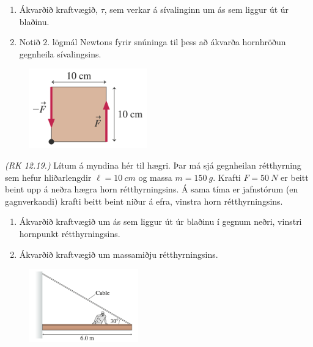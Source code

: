 \ifdefined \wholebook \else\documentclass[oneside]{book}\usepackage{EdlBook}\graphicspath{{figures/}}
\begin{document}
\begin{enumerate}[label = \textbf{Dæmi \thechapter.\arabic*.}]
\begin{minipage}{\linewidth}
\begin{enumerate}[label = \textbf{(\alph*)}]
    \item Ákvarðið kraftvægið, $\tau$, sem verkar á sívalinginn um ás sem liggur út úr blaðinu.
    \item Notið $2.$ lögmál Newtons fyrir snúninga til þess að ákvarða hornhröðun gegnheila sívalingsins.
\end{enumerate}

\end{minipage}

\vspace{0.5cm}

\begin{minipage}{\linewidth}

\begin{figure}
\vspace{-0.755cm}
\includegraphics[width=2in]{images/torque2.png}
\end{figure}

\item \textit{(RK 12.19.)} Lítum á myndina hér til hægri. Þar má sjá gegnheilan rétthyrning sem hefur hliðarlengdir $\ell = \SI{10}{cm}$ og massa $m = \SI{150}{g}$. Krafti $F = \SI{50}{N}$ er beitt beint upp á neðra hægra horn rétthyrningsins. Á sama tíma er jafnstórum (en gagnverkandi) krafti beitt beint niður á efra, vinstra horn rétthyrningsins.

\begin{enumerate}[label = \textbf{(\alph*)}]
    \item Ákvarðið kraftvægið um ás sem liggur út úr blaðinu í gegnum neðri, vinstri hornpunkt rétthyrningsins.
    \item Ákvarðið kraftvægið um massamiðju rétthyrningsins.
\end{enumerate}

\end{minipage}

\vspace{0.5cm}

\begin{minipage}{\linewidth}

\begin{figure}
\vspace{-1cm}
\includegraphics[width=1.85in]{images/construct.png}
\end{figure}


\end{minipage}
\end{enumerate}
\end{document}
